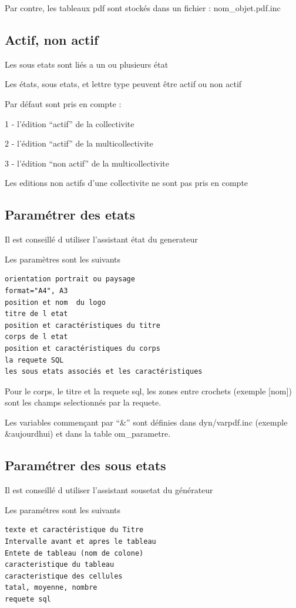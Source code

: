 \documentclass[letterpaper,10pt,french]{manual}
\begin{document}
Par contre, les tableaux pdf sont stockés dans un fichier : nom\_objet.pdf.inc


\subsection{Actif, non actif}

Les sous etats sont liés a un ou plusieurs état

Les états, sous etats, et lettre type peuvent être actif ou non actif

Par défaut sont pris en compte :

1 - l'édition  ``actif'' de la collectivite

2 - l'édition ``actif'' de la multicollectivite

3 - l'édition ``non actif'' de la multicollectivite

Les editions non actifs d'une collectivite ne sont pas pris en compte


\subsection{Paramétrer des etats}

Il est conseillé d utiliser l'assistant état du generateur

Les paramètres sont les suivants

\begin{Verbatim}[commandchars=@\[\]]
orientation portrait ou paysage
format="A4", A3
position et nom  du logo
titre de l etat
position et caractéristiques du titre
corps de l etat
position et caractéristiques du corps
la requete SQL
les sous etats associés et les caractéristiques
\end{Verbatim}

Pour le corps, le titre et la requete sql, les zones entre crochets (exemple {[}nom{]}) sont les champs selectionnés par la requete.

Les variables commençant par ``\&'' sont définies dans dyn/varpdf.inc (exemple \&aujourdhui)
et dans la table om\_parametre.


\subsection{Paramétrer des sous etats}

Il est conseillé d utiliser l'assistant sousetat du générateur

Les paramétres  sont les suivants

\begin{Verbatim}[commandchars=@\[\]]
texte et caractéristique du Titre
Intervalle avant et apres le tableau
Entete de tableau (nom de colone)
caracteristique du tableau
caracteristique des cellules
tatal, moyenne, nombre
requete sql
\end{Verbatim}
\end{document}
